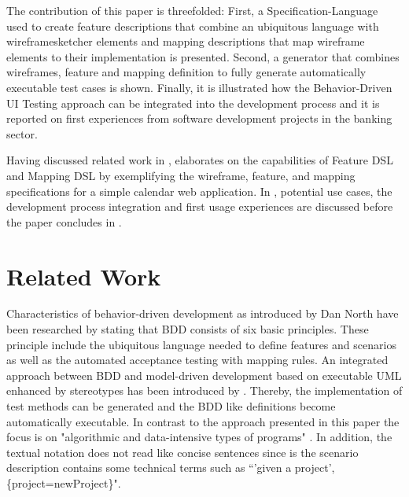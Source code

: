 \documentclass{sig-alternate-05-2015}
\begin{document}
The contribution of this paper is threefolded:
First, a Specification-Language used to create feature descriptions that combine an ubiquitous language with wireframesketcher elements \cite{Wireframesketcher} and mapping descriptions that map wireframe elements to their implementation is presented.
Second, a generator that combines wireframes, feature and mapping definition to fully generate automatically executable test cases is shown.
Finally, it is illustrated how the Behavior-Driven UI Testing approach can be integrated into the development process and it is reported on first experiences from software development projects in the banking sector.

Having discussed related work in ,  elaborates on the capabilities of Feature DSL and Mapping DSL by exemplifying the wireframe, feature, and mapping specifications for a simple calendar web application.
In , potential use cases, the development process integration and first usage experiences are discussed before the paper concludes in .


\section{Related Work}\label{sec:RelatedWork}
Characteristics of behavior-driven development as introduced by Dan North \cite{DanNorth} have been researched by \cite{C.Solis.2011} stating that BDD consists of six basic principles.
These principle include the ubiquitous language needed to define features and scenarios as well as the automated acceptance testing with mapping rules.
An integrated approach between BDD and model-driven development based on executable UML enhanced by stereotypes has been introduced by \cite{IoanLazar.2010}.
Thereby, the implementation of test methods can be generated and the BDD like definitions become automatically executable.
In contrast to the approach presented in this paper the focus is on "algorithmic and data-intensive types of programs" \cite{IoanLazar.2010}.
In addition, the textual notation does not read like concise sentences since is the scenario description contains some technical terms such as ``'given a project',\{project=newProject\}".
\end{document}
